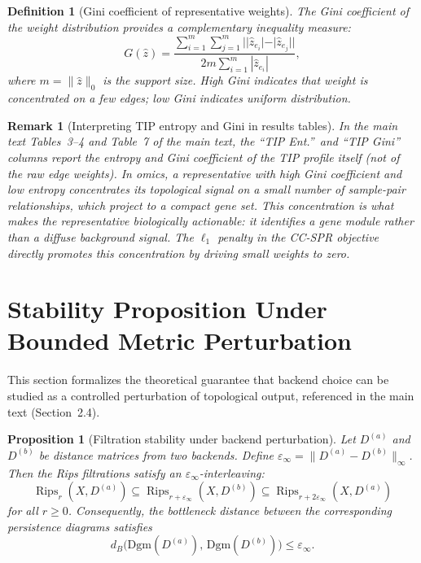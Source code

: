 \documentclass[11pt]{article}
\newtheorem{proposition}[theorem]{Proposition}
\newtheorem{definition}[theorem]{Definition}
\newtheorem{remark}[theorem]{Remark}
\DeclareMathOperator{\Rips}{Rips}
\begin{document}
\begin{definition}[Gini coefficient of representative weights]\label{def:supp_gini}
The \emph{Gini coefficient} of the weight distribution provides a complementary inequality measure:
\[
G(\hat{z}) = \frac{\sum_{i=1}^m \sum_{j=1}^m ||\hat{z}_{e_i}| - |\hat{z}_{e_j}||}{2m \sum_{i=1}^m |\hat{z}_{e_i}|},
\]
where $m = \|\hat{z}\|_0$ is the support size.
High Gini indicates that weight is concentrated on a few edges; low Gini indicates uniform distribution.
\end{definition}

\begin{remark}[Interpreting TIP entropy and Gini in results tables]\label{rem:supp_concentration}
In the main text Tables~3--4 and Table~7 of the main text, the ``TIP Ent.''\ and ``TIP Gini'' columns report the entropy and Gini coefficient of the TIP profile itself (not of the raw edge weights).
In omics, a representative with high Gini coefficient and low entropy concentrates its topological signal on a small number of sample-pair relationships, which project to a compact gene set.
This concentration is what makes the representative biologically actionable: it identifies a gene module rather than a diffuse background signal.
The $\ell_1$ penalty in the CC-SPR objective directly promotes this concentration by driving small weights to zero.
\end{remark}


\section{Stability Proposition Under Bounded Metric Perturbation}
\label{sec:supp_stability}

This section formalizes the theoretical guarantee that backend choice can be studied as a controlled perturbation of topological output, referenced in the main text (Section~2.4).

\begin{proposition}[Filtration stability under backend perturbation]\label{prop:supp_stability}
Let $D^{(a)}$ and $D^{(b)}$ be distance matrices from two backends.
Define $\varepsilon_\infty = \|D^{(a)} - D^{(b)}\|_\infty$.
Then the Rips filtrations satisfy an $\varepsilon_\infty$-interleaving:
\[
\Rips_r(X, D^{(a)}) \subseteq \Rips_{r + \varepsilon_\infty}(X, D^{(b)}) \subseteq \Rips_{r + 2\varepsilon_\infty}(X, D^{(a)})
\]
for all $r \ge 0$.
Consequently, the bottleneck distance between the corresponding persistence diagrams satisfies
\[
d_B\bigl(\mathrm{Dgm}(D^{(a)}),\, \mathrm{Dgm}(D^{(b)})\bigr) \le \varepsilon_\infty.
\]
\end{proposition}
\end{document}

